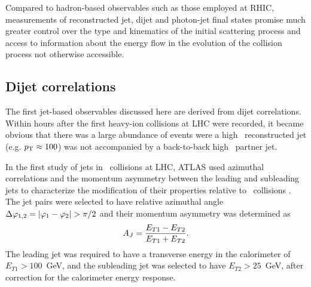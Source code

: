 Compared to hadron-based observables such as those employed at RHIC, measurements of reconstructed
jet, dijet and photon-jet final states promise much greater control over the type and kinematics
of the initial scattering process and access to information about the energy flow in the evolution
of the collision process not otherwise accessible.

\subsection{Dijet correlations}

The first jet-based observables discussed here are derived from dijet correlations. Within hours
after the first heavy-ion collisions at LHC were recorded, it became obvious that there was
a large abundance of events were a high \pT\ reconstructed jet (e.g. $\mbox{$p_{\mathrm{T}}$} \approx 100$\GeVc) was
not accompanied by a back-to-back high \pT\ partner jet.

In the first study of jets in \PbPb\ collisions at LHC, ATLAS used azimuthal correlations and the
momentum asymmetry between the leading and subleading jets to characterize the modification
of their properties relative to \pp\ collisions \cite{Aad:2010bu}.
The jet pairs were selected to have relative azimuthal angle $\Delta\varphi_{1,2} =|\varphi_1-\varphi_2| > \pi/2$
and their momentum asymmetry was determined as
\begin{equation}
A_J = \frac{E_{T1}-E_{T2}}{E_{T1}+E_{T2}}.
\end{equation}
The leading jet was required to have a transverse energy in the calorimeter of $E_{T1} > 100$~GeV,
and the subleading jet was selected to have $E_{T2} > 25$~GeV, after correction for
the calorimeter energy response.

